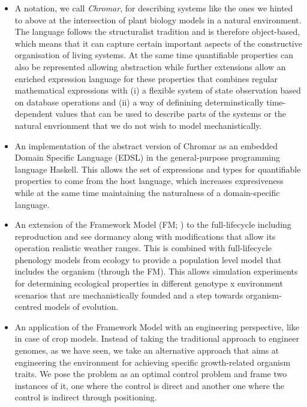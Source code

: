 \begin{itemize}
\item A notation, we call \emph{Chromar}, for describing systems like the ones
  we hinted to above at the intersection of plant biology models in a natural
  environment. The language follows the structuralist tradition and is therefore
  object-based, which means that it can capture certain important aspects of the
  constructive organisation of living systems. At the same time quantifiable
  properties can also be represented allowing abstraction while further
  extensions allow an enriched expression language for these properties that
  combines regular mathematical expressions with (i) a flexible system of state
  observation based on database operations and (ii) a way of definining
  determinstically time-dependent values that can be used to describe parts of
  the systems or the natural envrionment that we do not wish to model
  mechanistically.
\item An implementation of the abstract version of Chromar as an embedded Domain
  Specific Language (EDSL) in the general-purpose programming language
  Haskell. This allows the set of expressions and types for quantifiable
  properties to come from the host language, which increases expresiveness while
  at the same time maintaining the naturalness of a domain-specific language.
\item An extension of the Framework Model (FM; ) to the full-lifecycle
  including reproduction and see dormancy along with modifications that allow
  its operation realistic weather ranges. This is combined with full-lifecycle
  phenology models from ecology to provide a population level model that
  includes the organism (through the FM). This allows simulation experiments for
  determining ecological properties in different genotype x environment
  scenarios that are mechanistically founded and a step towards organism-centred
  models of evolution.
\item An application of the Framework Model with an engineering perspective,
  like in case of crop models. Instead of taking the traditional approach to
  engineer genomes, as we have seen, we take an alternative approach that aims
  at engineering the environment for achieving specific growth-related organism
  traits. We pose the problem as an optimal control problem and frame two
  instances of it, one where the control is direct and another one where the
  control is indirect through positioning.
\end{itemize}

